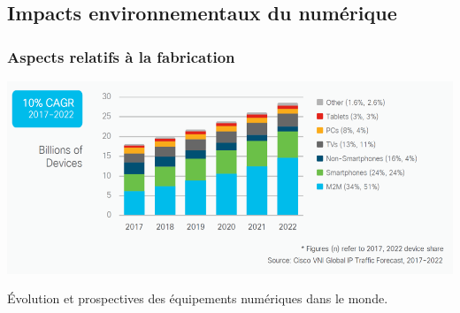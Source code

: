 \subsection[Impacts environnementaux]{Impacts environnementaux du numérique}
\label{sub:IX.4.2}

\subsubsection[Aspects de fabrication]{Aspects relatifs à la fabrication}
\label{subsub:IX.4.2.1}


\begin{jazzfigure}
\includegraphics[width=\linewidth]{./Images/Chapter09/figIX-03-billions-of-devices.png}
\caption{\label{fig:IX.3}Évolution et prospectives des équipements numériques dans le monde.}
\end{jazzfigure}



